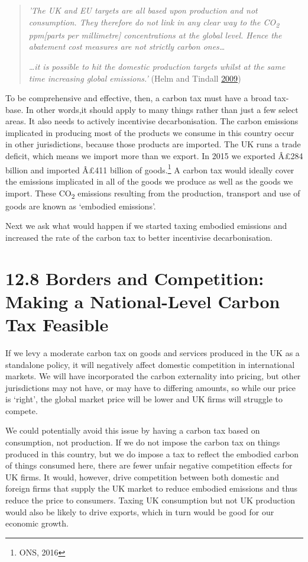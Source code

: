 \documentclass[]{tufte-handout}
\begin{document}
\begin{quote}
\emph{'The UK and EU targets are all based upon production and not
consumption. They therefore do not link in any clear way to the
CO\textsubscript{2} ppm{[}parts per millimetre{]} concentrations at the
global level. Hence the abatement cost measures are not strictly carbon
ones\ldots{}}

\emph{\ldots{}it is possible to hit the domestic production targets
whilst at the same time increasing global emissions.'} (Helm and Tindall
\protect\hyperlink{ref-Helm2009}{2009})
\end{quote}

To be comprehensive and effective, then, a carbon tax must have a broad
tax-base. In other words,it should apply to many things rather than just
a few select areas. It also needs to actively incentivise
decarbonisation. The carbon emissions implicated in producing most of
the products we consume in this country occur in other jurisdictions,
because those products are imported. The UK runs a trade deficit, which
means we import more than we export. In 2015 we exported Â£284 billion
and imported Â£411 billion of goods.\footnote{ONS, 2016} A carbon tax
would ideally cover the emissions implicated in all of the goods we
produce as well as the goods we import. These CO\textsubscript{2}
emissions resulting from the production, transport and use of goods are
known as `embodied emissions'.

Next we ask what would happen if we started taxing embodied emissions
and increased the rate of the carbon tax to better incentivise
decarbonisation.

\hypertarget{borders-and-competition-making-a-national-level-carbon-tax-feasible}{%
\section{12.8 Borders and Competition: Making a National-Level Carbon
Tax
Feasible}\label{borders-and-competition-making-a-national-level-carbon-tax-feasible}}

If we levy a moderate carbon tax on goods and services produced in the
UK as a standalone policy, it will negatively affect domestic
competition in international markets. We will have incorporated the
carbon externality into pricing, but other jurisdictions may not have,
or may have to differing amounts, so while our price is `right', the
global market price will be lower and UK firms will struggle to compete.

We could potentially avoid this issue by having a carbon tax based on
consumption, not production. If we do not impose the carbon tax on
things produced in this country, but we do impose a tax to reflect the
embodied carbon of things consumed here, there are fewer unfair negative
competition effects for UK firms. It would, however, drive competition
between both domestic and foreign firms that supply the UK market to
reduce embodied emissions and thus reduce the price to consumers. Taxing
UK consumption but not UK production would also be likely to drive
exports, which in turn would be good for our economic growth.
\end{document}

